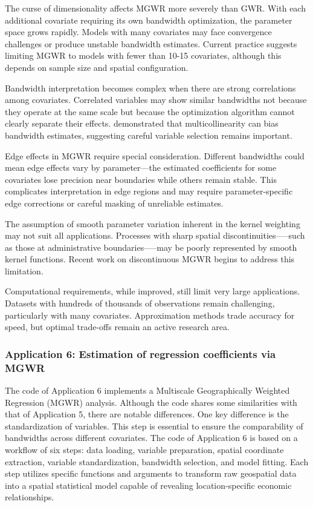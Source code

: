 \documentclass[smallextended, natbib]{svjour3}       %
\begin{document}
The curse of dimensionality affects MGWR more severely than GWR. 
With each additional covariate requiring its own bandwidth optimization, the parameter space grows rapidly. 
Models with many covariates may face convergence challenges or produce unstable bandwidth estimates. 
Current practice suggests limiting MGWR to models with fewer than 10-15 covariates, although this depends on sample size and spatial configuration.

Bandwidth interpretation becomes complex when there are strong correlations among covariates. 
Correlated variables may show similar bandwidths not because they operate at the same scale but because the optimization algorithm cannot clearly separate their effects. 
\cite{wheeler2018multicollinearity} demonstrated that multicollinearity can bias bandwidth estimates, suggesting careful variable selection remains important.

Edge effects in MGWR require special consideration. 
Different bandwidths could mean edge effects vary by parameter---the estimated coefficients for some covariates lose precision near boundaries while others remain stable. 
This complicates interpretation in edge regions and may require parameter-specific edge corrections or careful masking of unreliable estimates.

The assumption of smooth parameter variation inherent in the kernel weighting may not suit all applications.
Processes with sharp spatial discontinuities—--such as those at administrative boundaries—--may be poorly represented by smooth kernel functions. 
Recent work on discontinuous MGWR \citep{wang2023discontinuous} begins to address this limitation.

Computational requirements, while improved, still limit very large applications. 
Datasets with hundreds of thousands of observations remain challenging, particularly with many covariates. 
Approximation methods trade accuracy for speed, but optimal trade-offs remain an active research area.


\subsubsection*{Application 6: Estimation of regression coefficients via MGWR}


The code of Application 6 implements a Multiscale Geographically Weighted Regression (MGWR) analysis. 
Although the code shares some similarities with that of Application 5, there are notable differences.
One key difference is the standardization of variables.
This step is essential to ensure the comparability of bandwidths across different covariates.
The code of Application 6 is based on a workflow of six steps: data loading, variable preparation, spatial coordinate extraction, variable standardization, bandwidth selection, and model fitting. 
Each step utilizes specific functions and arguments to transform raw geospatial data into a spatial statistical model capable of revealing location-specific economic relationships.
\end{document}

